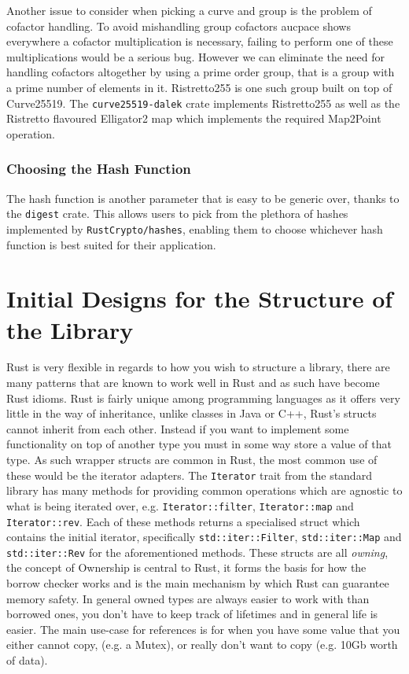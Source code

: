 Another issue to consider when picking a curve and group is the problem of cofactor handling.
To avoid mishandling group cofactors \gls{aucpace} shows everywhere a cofactor multiplication is necessary, failing to perform one of these multiplications would be a serious bug.
However we can eliminate the need for handling cofactors altogether by using a prime order group, that is a group with a prime number of elements in it.
Ristretto255 \cite{ristretto255} is one such group built on top of Curve25519.
The \texttt{curve25519-dalek} crate implements Ristretto255 as well as the Ristretto flavoured Elligator2 map \cite{elligator2} which implements the required \textsf{Map2Point} operation.

\subsubsection{Choosing the Hash Function}
The hash function is another parameter that is easy to be generic over, thanks to the \texttt{digest} crate.
This allows users to pick from the plethora of hashes implemented by \texttt{RustCrypto/hashes}, enabling them to choose whichever hash function is best suited for their application.

\section{Initial Designs for the Structure of the Library}
Rust is very flexible in regards to how you wish to structure a library, there are many patterns that are known to work well in Rust and as such have become Rust idioms.
Rust is fairly unique among programming languages as it offers very little in the way of inheritance, unlike classes in Java or C++, Rust's structs cannot inherit from each other.
Instead if you want to implement some functionality on top of another type you must in some way store a value of that type.
As such wrapper structs are common in Rust, the most common use of these would be the iterator adapters.
The \texttt{Iterator} trait from the standard library has many methods for providing common operations which are agnostic to what is being iterated over, e.g. \texttt{Iterator::filter}, \texttt{Iterator::map} and \texttt{Iterator::rev}.
Each of these methods returns a specialised struct which contains the initial iterator, specifically \texttt{std::iter::Filter}, \texttt{std::iter::Map} and \texttt{std::iter::Rev} for the aforementioned methods.
These structs are all \textit{owning}, the concept of Ownership is central to Rust, it forms the basis for how the borrow checker works and is the main mechanism by which Rust can guarantee memory safety.
In general owned types are always easier to work with than borrowed ones, you don't have to keep track of lifetimes and in general life is easier.
The main use-case for references is for when you have some value that you either cannot copy, (e.g. a Mutex), or really don't want to copy (e.g. 10Gb worth of data).

